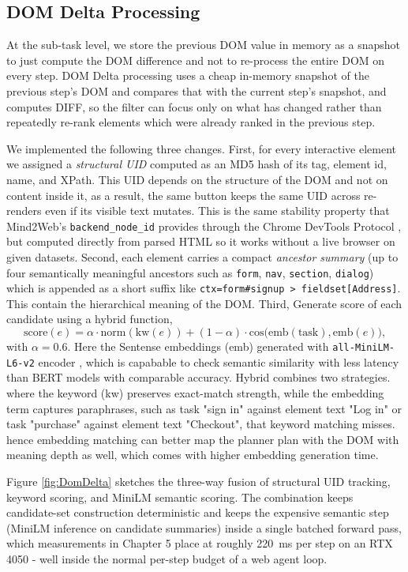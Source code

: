 \subsection{DOM Delta Processing}


At the sub-task level, we store the previous DOM value in memory as a snapshot to just compute the DOM difference and not to re-process the entire DOM on every step.
DOM Delta processing uses a cheap in-memory snapshot of the previous step's DOM and compares that with the current step's snapshot, and computes DIFF, so the filter can focus only on what has changed rather than repeatedly re-rank elements which were already ranked in the previous step.

We implemented the following three changes. First, for every interactive element we assigned a \textit{structural UID} computed as an MD5 hash of its tag, element id, name, and XPath. This UID depends on the structure of the DOM and not on content inside it, as a result, the same button keeps the same UID across re-renders even if its visible text mutates. This is the same stability property that Mind2Web's \texttt{backend\_node\_id} provides through the Chrome DevTools Protocol \cite{deng2023mind2webgeneralistagentweb}, but computed directly from parsed HTML so it works without a live browser on given datasets. Second, each element carries a compact \textit{ancestor summary} (up to four semantically meaningful ancestors such as \texttt{form}, \texttt{nav}, \texttt{section}, \texttt{dialog}) which is appended as a short suffix like \texttt{ctx=form\#signup > fieldset[Address]}. This contain the hierarchical meaning of the DOM. Third, Generate score of each candidate using a hybrid function,
\[
\mathrm{score}(e) = \alpha \cdot \mathrm{norm}(\mathrm{kw}(e)) + (1-\alpha) \cdot \mathrm{cos}\big(\mathrm{emb}(\mathrm{task}),\mathrm{emb}(e)\big),
\]
with $\alpha = 0.6$. Here the Sentense embeddings (emb) generated with \texttt{all-MiniLM-L6-v2} encoder \cite{wang2020minilm}, which is capabable to check semantic similarity with less latency than BERT models with comparable accuracy. Hybrid combines two strategies. where the keyword (kw)  preserves exact-match strength, while the embedding term captures paraphrases, such as task "sign in" against element text "Log in" or task "purchase" against element text "Checkout", that keyword matching misses. hence embedding matching can better map the planner plan with the DOM with meaning depth as well, which comes with higher embedding generation time.

Figure \ref{fig:DomDelta} sketches the three-way fusion of structural UID tracking, keyword scoring, and MiniLM semantic scoring. The combination keeps candidate-set construction deterministic and keeps the expensive semantic step (MiniLM inference on candidate summaries) inside a single batched forward pass, which measurements in Chapter 5 place at roughly 220~ms per step on an RTX 4050 - well inside the normal per-step budget of a web agent loop.

